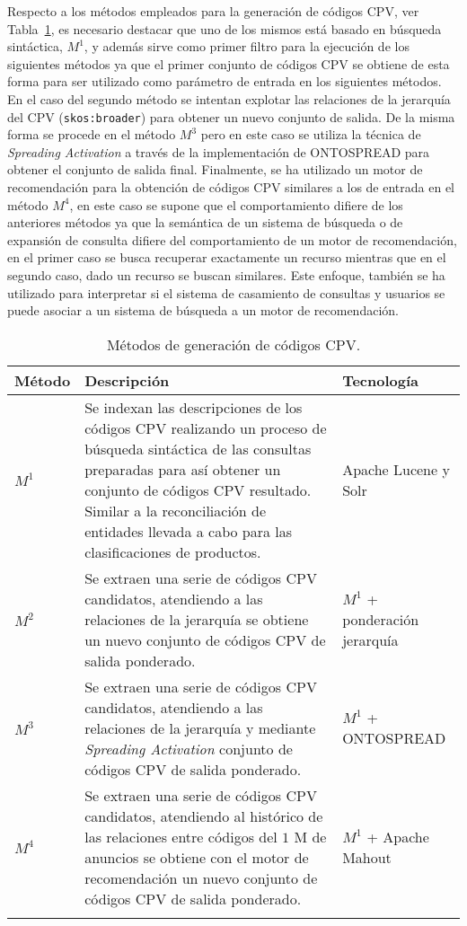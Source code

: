 \begin{enumerate}
Respecto a los métodos empleados para la generación de códigos \gls{CPV}, ver Tabla~\ref{table:metodos-ir}, es necesario destacar que uno de los mismos está basado 
en búsqueda sintáctica, $M^1$, y además sirve como primer filtro para la ejecución de los siguientes métodos ya que 
el primer conjunto de códigos CPV se obtiene de esta forma para ser utilizado como parámetro de entrada en los siguientes 
métodos. En el caso del segundo método se intentan explotar las relaciones de la jerarquía del CPV (\texttt{skos:broader}) para 
obtener un nuevo conjunto de salida. De la misma forma se procede en el método $M^3$ pero en este caso se utiliza la 
técnica de \textit{Spreading Activation} a través de la implementación de ONTOSPREAD para obtener el conjunto de salida 
final. Finalmente, se ha utilizado un motor de recomendación para la obtención de códigos CPV similares a los de entrada 
en el método $M^4$, en este caso se supone que el comportamiento difiere de los anteriores métodos ya que la semántica 
de un sistema de búsqueda o de expansión de consulta difiere del comportamiento de un motor de recomendación, en el primer 
caso se busca recuperar exactamente un recurso mientras que en el segundo caso, dado un recurso se buscan similares. Este enfoque, 
también se ha utilizado para interpretar si el sistema de casamiento de consultas y usuarios se puede asociar a un sistema 
de búsqueda a un motor de recomendación.

\begin{longtable}[c]{|l|p{7cm}|p{5cm}|} 
\hline
\textbf{Método} &  \textbf{Descripción} &  \textbf{Tecnología} \\\hline
\endhead
$M^1$ & Se indexan las descripciones de los códigos CPV realizando un proceso de búsqueda sintáctica de las consultas preparadas para así 
obtener un conjunto de códigos CPV resultado. Similar a la reconciliación de entidades llevada a cabo para las clasificaciones de productos. & Apache Lucene y Solr \\ \hline
$M^2$ & Se extraen una serie de códigos CPV candidatos, atendiendo a las relaciones de la jerarquía se obtiene un nuevo 
conjunto de códigos CPV de salida ponderado. & $M^1$ + ponderación jerarquía \\ \hline
$M^3$ & Se extraen una serie de códigos CPV candidatos, atendiendo a las relaciones de la jerarquía y mediante \textit{Spreading Activation} 
conjunto de códigos CPV de salida ponderado. & $M^1$ + ONTOSPREAD \\ \hline
$M^4$ & Se extraen una serie de códigos CPV candidatos, atendiendo al histórico de las relaciones 
entre códigos del $1$ M de anuncios se obtiene con el motor de recomendación un nuevo 
conjunto de códigos CPV de salida ponderado. & $M^1$ + Apache Mahout \\ \hline
\hline
\caption{Métodos de generación de códigos CPV.}\label{table:metodos-ir}\\    
\end{longtable}


\end{enumerate}
